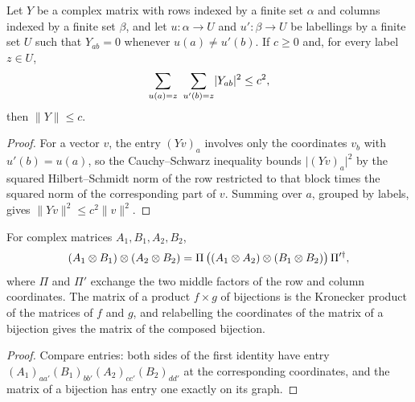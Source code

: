 \begin{lemma}
    \label{lem:block_diagonal_operator_norm}
    \leanok
    Let $Y$ be a complex matrix with rows indexed by a finite set $\alpha$ and
    columns indexed by a finite set $\beta$, and let $u:\alpha\to U$ and
    $u':\beta\to U$ be labellings by a finite set $U$ such that $Y_{ab}=0$
    whenever $u(a)\ne u'(b)$. If $c\ge0$ and, for every label $z\in U$,
    \begin{align}
        \sum_{u(a)=z}\ \sum_{u'(b)=z}\lvert Y_{ab}\rvert^2\le c^2,
        \notag
    \end{align}
    then $\lVert Y\rVert\le c$.
\end{lemma}

\begin{proof}\leanok
    For a vector $v$, the entry $(Yv)_a$ involves only the coordinates $v_b$
    with $u'(b)=u(a)$, so the Cauchy--Schwarz inequality bounds
    $\lvert(Yv)_a\rvert^2$ by the squared Hilbert--Schmidt norm of the row
    restricted to that block times the squared norm of the corresponding part
    of $v$. Summing over $a$, grouped by labels, gives
    $\lVert Yv\rVert^2\le c^2\lVert v\rVert^2$.
\end{proof}

\begin{lemma}
    \label{lem:kronecker_shuffle}
    \leanok
    For complex matrices $A_1,B_1,A_2,B_2$,
    \begin{align}
        (A_1\otimes B_1)\otimes(A_2\otimes B_2)
        =\Pi\,\bigl((A_1\otimes A_2)\otimes(B_1\otimes B_2)\bigr)\,\Pi'^{\dagger},
        \notag
    \end{align}
    where $\Pi$ and $\Pi'$ exchange the two middle factors of the row and
    column coordinates. The matrix of a product $f\times g$ of bijections is the
    Kronecker product of the matrices of $f$ and $g$, and relabelling the
    coordinates of the matrix of a bijection gives the matrix of the composed
    bijection.
\end{lemma}

\begin{proof}\leanok
    Compare entries: both sides of the first identity have entry
    $(A_1)_{aa'}(B_1)_{bb'}(A_2)_{cc'}(B_2)_{dd'}$ at the corresponding
    coordinates, and the matrix of a bijection has entry one exactly on its
    graph.
\end{proof}

